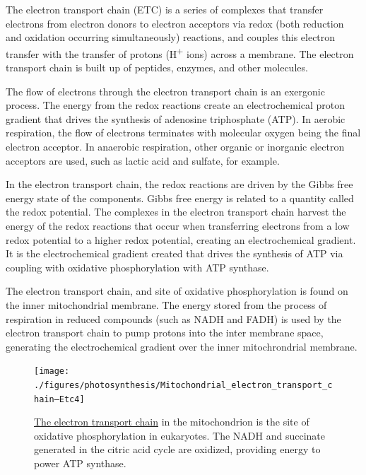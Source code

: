 The electron transport chain (ETC) is a series of complexes that transfer electrons from electron donors to electron acceptors via redox (both reduction and oxidation occurring simultaneously) reactions, and couples this electron transfer with the transfer of protons (H\textsuperscript{+} ions) across a membrane. The electron transport chain is built up of peptides, enzymes, and other molecules.

The flow of electrons through the electron transport chain is an exergonic process. The energy from the redox reactions create an electrochemical proton gradient that drives the synthesis of adenosine triphosphate (ATP). In aerobic respiration, the flow of electrons terminates with molecular oxygen being the final electron acceptor. In anaerobic respiration, other organic or inorganic electron acceptors are used, such as lactic acid and sulfate, for example.

In the electron transport chain, the redox reactions are driven by the Gibbs free energy state of the components. Gibbs free energy is related to a quantity called the redox potential. The complexes in the electron transport chain harvest the energy of the redox reactions that occur when transferring electrons from a low redox potential to a higher redox potential, creating an electrochemical gradient. It is the electrochemical gradient created that drives the synthesis of ATP via coupling with oxidative phosphorylation with ATP synthase.

The electron transport chain, and site of oxidative phosphorylation is found on the inner mitochondrial membrane. The energy stored from the process of respiration in reduced compounds (such as NADH and FADH) is used by the electron transport chain to pump protons into the inter membrane space, generating the electrochemical gradient over the inner mitochrondrial membrane.



\begin{figure}

{\centering \texttt{[image: ./figures/photosynthesis/Mitochondrial\_electron\_transport\_chain—Etc4]} 

}

\caption{\href{https://commons.wikimedia.org/wiki/File:Mitochondrial_electron_transport_chain—Etc4.svg}{The electron transport chain} in the mitochondrion is the site of oxidative phosphorylation in eukaryotes. The NADH and succinate generated in the citric acid cycle are oxidized, providing energy to power ATP synthase.}\label{fig:electrontransfer}
\end{figure}

